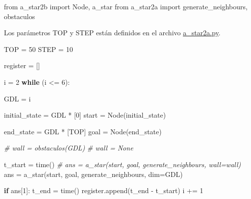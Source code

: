 \documentclass[
]{article}
\newenvironment{Shaded}{}{}
\newcommand{\CommentTok}[1]{\textcolor[rgb]{0.38,0.63,0.69}{\textit{#1}}}
\newcommand{\ControlFlowTok}[1]{\textcolor[rgb]{0.00,0.44,0.13}{\textbf{#1}}}
\newcommand{\DecValTok}[1]{\textcolor[rgb]{0.25,0.63,0.44}{#1}}
\newcommand{\ImportTok}[1]{#1}
\newcommand{\NormalTok}[1]{#1}
\newcommand{\OperatorTok}[1]{\textcolor[rgb]{0.40,0.40,0.40}{#1}}
\begin{document}
\begin{Shaded}
\begin{Highlighting}[]
\ImportTok{from}\NormalTok{ a_star2b }\ImportTok{import}\NormalTok{ Node, a_star}
\ImportTok{from}\NormalTok{ a_star2a }\ImportTok{import}\NormalTok{ generate_neighbours, obstaculos}
\end{Highlighting}
\end{Shaded}

Los parámetros TOP y STEP están definidos en el archivo
\href{./a_star2a.py}{a\_star2a.py}.

\begin{Shaded}
\begin{Highlighting}[]
\NormalTok{TOP }\OperatorTok{=} \DecValTok{50}
\NormalTok{STEP }\OperatorTok{=} \DecValTok{10}
\end{Highlighting}
\end{Shaded}

\begin{Shaded}
\begin{Highlighting}[]
\NormalTok{register }\OperatorTok{=}\NormalTok{ []}

\NormalTok{i }\OperatorTok{=} \DecValTok{2}
\ControlFlowTok{while}\NormalTok{ (i }\OperatorTok{<=} \DecValTok{6}\NormalTok{):}
    
\NormalTok{    GDL }\OperatorTok{=}\NormalTok{ i}
    
\NormalTok{    initial_state }\OperatorTok{=}\NormalTok{ GDL }\OperatorTok{*}\NormalTok{ [}\DecValTok{0}\NormalTok{]}
\NormalTok{    start }\OperatorTok{=}\NormalTok{ Node(initial_state)}

\NormalTok{    end_state }\OperatorTok{=}\NormalTok{ GDL }\OperatorTok{*}\NormalTok{ [TOP]}
\NormalTok{    goal }\OperatorTok{=}\NormalTok{ Node(end_state)}
    
    \CommentTok{# wall = obstaculos(GDL)}
    \CommentTok{# wall = None}
    
\NormalTok{    t_start }\OperatorTok{=}\NormalTok{ time()}
    \CommentTok{# ans = a_star(start, goal, generate_neighbours, wall=wall)}
\NormalTok{    ans }\OperatorTok{=}\NormalTok{ a_star(start, goal, generate_neighbours, dim}\OperatorTok{=}\NormalTok{GDL)}

    \ControlFlowTok{if}\NormalTok{ ans[}\DecValTok{1}\NormalTok{]:}
\NormalTok{        t_end }\OperatorTok{=}\NormalTok{ time()}
\NormalTok{        register.append(t_end }\OperatorTok{-}\NormalTok{ t_start)}
\NormalTok{        i }\OperatorTok{+=} \DecValTok{1}
\end{Highlighting}
\end{Shaded}
\end{document}
